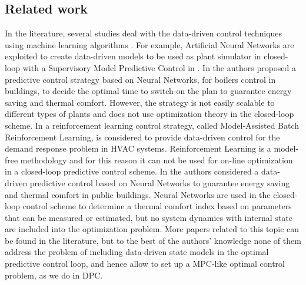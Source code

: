 \subsection{Related work}
In the literature, several studies deal with the data-driven control techniques using machine learning algorithms \cite{Hou2013}. For example, Artificial Neural Networks are exploited to create data-driven models to be used as plant simulator in closed-loop with a Supervisory Model Predictive Control in \cite{Afram2017}. In \cite{Macarulla2017} the authors proposed a predictive control strategy based on Neural Networks, for boilers control in buildings, to decide the optimal time to switch-on the plan to guarantee energy saving and thermal comfort. However, the strategy is not easily scalable to different types of plants and does not use optimization theory in the closed-loop scheme. In \cite{Costanzo2016} a reinforcement learning control strategy, called Model-Assisted Batch Reinforcement Learning, is considered to provide data-driven control for the demand response problem in HVAC systems. Reinforcement Learning is a model-free methodology and for this reason it can not be used for on-line optimization in a closed-loop predictive control scheme. In \cite{Ferreira2012} the authors considered a data-driven predictive control based on Neural Networks to guarantee energy saving and  thermal comfort in public buildings. Neural Networks are used in the closed-loop control scheme to determine a thermal comfort index based on parameters that can be measured or estimated, but no  system dynamics with internal state are included into the optimization problem. More papers related to this topic can be found in the literature, but to the best of the authors' knowledge none of them address the problem of including data-driven state models in the optimal predictive control loop, and hence allow to set up a MPC-like optimal control problem, as we do in DPC.

